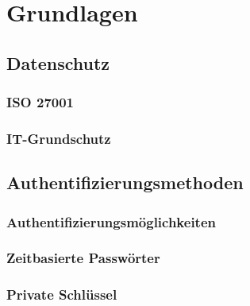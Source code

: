 \chapter{Grundlagen}

\section{Datenschutz}
\subsection{ISO 27001}
\subsection{IT-Grundschutz}

\section{Authentifizierungsmethoden}
\subsection{Authentifizierungsmöglichkeiten}
\subsection{Zeitbasierte Passwörter}
\subsection{Private Schlüssel}
